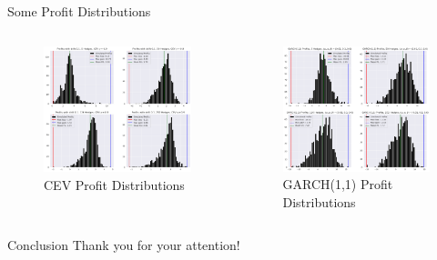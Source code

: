 \documentclass[presentation]{beamer}
\begin{document}
\begin{frame}[label={sec:orgfad2c70}]{Some Profit Distributions}
\begin{columns}
\begin{column}{0.5\columnwidth}
\begin{figure}[htbp]
\centering
\includegraphics[width=.9\linewidth]{./figures/cev-distribution.png}
\caption{CEV Profit Distributions}
\end{figure}
\end{column}
\begin{column}{0.5\columnwidth}
\begin{figure}[htbp]
\centering
\includegraphics[width=.9\linewidth]{./figures/GARCH-distribution.png}
\caption{GARCH(1,1) Profit Distributions}
\end{figure}
\end{column}
\end{columns}
\end{frame}
\begin{frame}[label={sec:org9419282}]{Conclusion}
Thank you for your attention!
\end{frame}
\end{document}
